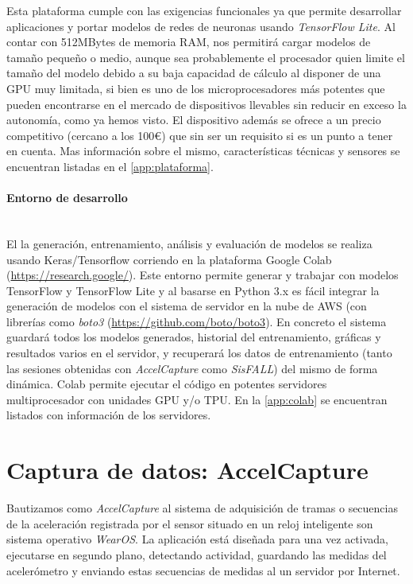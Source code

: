 Esta plataforma cumple con las exigencias funcionales ya que permite desarrollar aplicaciones y portar modelos de redes de neuronas usando \textit{TensorFlow Lite}. Al contar con 512MBytes de memoria RAM, nos permitirá cargar modelos de tamaño pequeño o medio, aunque sea probablemente el procesador quien limite el tamaño del modelo debido a su baja capacidad de cálculo al disponer de una GPU muy limitada, si bien es uno de los microprocesadores más potentes que pueden encontrarse en el mercado de dispositivos llevables sin reducir en exceso la autonomía, como ya hemos visto. El dispositivo además se ofrece a un precio competitivo (cercano a los 100€) que sin ser un requisito si es un punto a tener en cuenta. Mas información sobre el mismo, características técnicas y sensores se encuentran listadas en el \autoref{app:plataforma}.

\paragraph{Entorno de desarrollo}\\
El la generación, entrenamiento, análisis y evaluación de modelos se realiza usando Keras/Tensorflow corriendo en la plataforma Google Colab (\url{https://research.google/}). Este entorno permite generar y trabajar con modelos TensorFlow y TensorFlow Lite y al basarse en Python 3.x es fácil integrar la generación de modelos con el sistema de servidor en la nube de AWS (con librerías como \textit{boto3} (\url{https://github.com/boto/boto3}). En concreto el sistema guardará todos los modelos generados, historial del entrenamiento, gráficas y resultados varios en el servidor, y recuperará los datos de entrenamiento (tanto las sesiones obtenidas con \textit{AccelCapture} como \textit{SisFALL}) del mismo de forma dinámica. Colab permite ejecutar el código en potentes servidores multiprocesador con unidades GPU y/o TPU. En la \autoref{app:colab} se encuentran listados con información de los servidores.


\section{Captura de datos: AccelCapture}\label{sec:imp:accelcapture}

Bautizamos como \textit{AccelCapture} al sistema de adquisición de tramas o secuencias de la aceleración registrada por el sensor situado en un reloj inteligente son sistema operativo \textit{WearOS}. La aplicación está diseñada para una vez activada, ejecutarse en segundo plano, detectando actividad, guardando las medidas del acelerómetro y enviando estas secuencias de medidas al un servidor por Internet.

